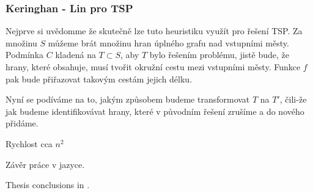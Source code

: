 \documentclass[
  biblatex,
  figures=false,
  glossaries,
  index
]{kidiplom}
\begin{document}
\subsubsection{Keringhan - Lin pro TSP}
Nejprve si uvědomme že skutečně lze tuto heuristiku využít pro řešení TSP. Za množinu $S$ můžeme brát množinu hran úplného grafu nad vstupními městy. Podmínka $C$ kladená na $T \subset S$, aby $T$ bylo řešením problému, jistě bude, že hrany, které obsahuje, musí tvořit okružní cestu mezi vstupními městy. Funkce $f$ pak bude přiřazovat takovým cestám jejich délku.

Nyní se podíváme na to, jakým způsobem budeme transformovat $T$ na $T'$, čili-že jak budeme identifikovávat hrany, které v původním řešení zrušíme a do nového přidáme.



Rychlost cca $n ^ 2$

\begin{kiconclusions}
Závěr práce v  jazyce.
\end{kiconclusions}

\begin{kiconclusions}[english]
Thesis conclusions in .
\end{kiconclusions}



\printglossary


\nocite{*}
\printbibliography

%
%

\printindex
\end{document}
